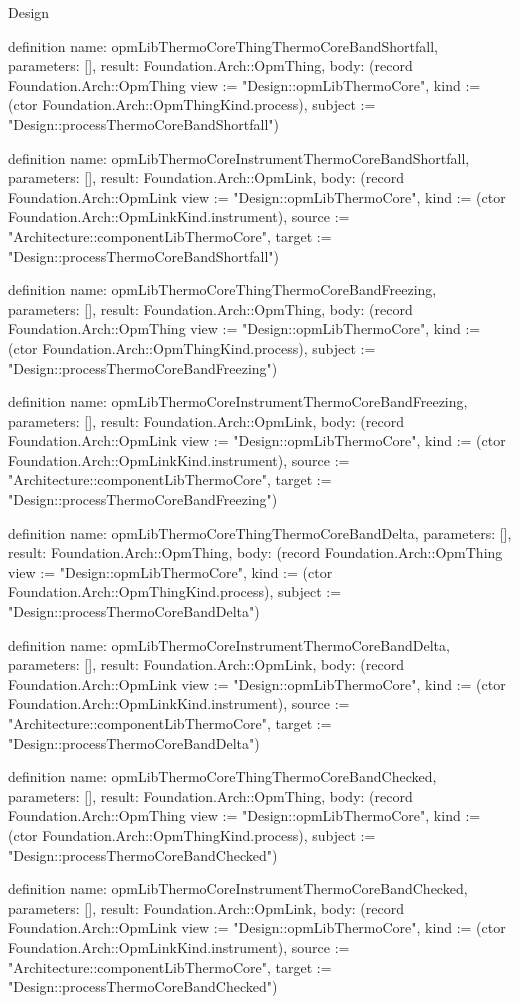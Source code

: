 \begin{lexlean}{Design}
\begin{semanticmodule}
definition{
  name: opmLibThermoCoreThingThermoCoreBandShortfall,
  parameters: [],
  result: Foundation.Arch::OpmThing,
  body: (record Foundation.Arch::OpmThing {view := "Design::opmLibThermoCore", kind := (ctor Foundation.Arch::OpmThingKind.process), subject := "Design::processThermoCoreBandShortfall"})
}

definition{
  name: opmLibThermoCoreInstrumentThermoCoreBandShortfall,
  parameters: [],
  result: Foundation.Arch::OpmLink,
  body: (record Foundation.Arch::OpmLink {view := "Design::opmLibThermoCore", kind := (ctor Foundation.Arch::OpmLinkKind.instrument), source := "Architecture::componentLibThermoCore", target := "Design::processThermoCoreBandShortfall"})
}

definition{
  name: opmLibThermoCoreThingThermoCoreBandFreezing,
  parameters: [],
  result: Foundation.Arch::OpmThing,
  body: (record Foundation.Arch::OpmThing {view := "Design::opmLibThermoCore", kind := (ctor Foundation.Arch::OpmThingKind.process), subject := "Design::processThermoCoreBandFreezing"})
}

definition{
  name: opmLibThermoCoreInstrumentThermoCoreBandFreezing,
  parameters: [],
  result: Foundation.Arch::OpmLink,
  body: (record Foundation.Arch::OpmLink {view := "Design::opmLibThermoCore", kind := (ctor Foundation.Arch::OpmLinkKind.instrument), source := "Architecture::componentLibThermoCore", target := "Design::processThermoCoreBandFreezing"})
}

definition{
  name: opmLibThermoCoreThingThermoCoreBandDelta,
  parameters: [],
  result: Foundation.Arch::OpmThing,
  body: (record Foundation.Arch::OpmThing {view := "Design::opmLibThermoCore", kind := (ctor Foundation.Arch::OpmThingKind.process), subject := "Design::processThermoCoreBandDelta"})
}

definition{
  name: opmLibThermoCoreInstrumentThermoCoreBandDelta,
  parameters: [],
  result: Foundation.Arch::OpmLink,
  body: (record Foundation.Arch::OpmLink {view := "Design::opmLibThermoCore", kind := (ctor Foundation.Arch::OpmLinkKind.instrument), source := "Architecture::componentLibThermoCore", target := "Design::processThermoCoreBandDelta"})
}

definition{
  name: opmLibThermoCoreThingThermoCoreBandChecked,
  parameters: [],
  result: Foundation.Arch::OpmThing,
  body: (record Foundation.Arch::OpmThing {view := "Design::opmLibThermoCore", kind := (ctor Foundation.Arch::OpmThingKind.process), subject := "Design::processThermoCoreBandChecked"})
}

definition{
  name: opmLibThermoCoreInstrumentThermoCoreBandChecked,
  parameters: [],
  result: Foundation.Arch::OpmLink,
  body: (record Foundation.Arch::OpmLink {view := "Design::opmLibThermoCore", kind := (ctor Foundation.Arch::OpmLinkKind.instrument), source := "Architecture::componentLibThermoCore", target := "Design::processThermoCoreBandChecked"})
}


\end{semanticmodule}
\end{lexlean}

